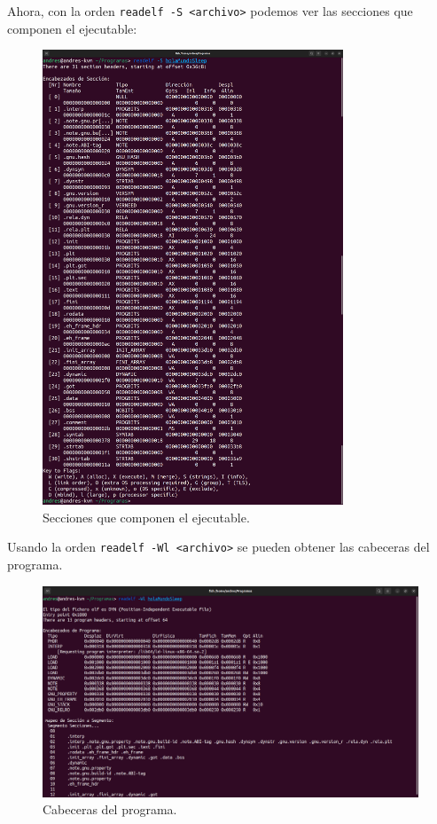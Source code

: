 \documentclass{article}
\begin{document}
\newpage

Ahora, con la orden \verb|readelf -S <archivo>| podemos ver las secciones que componen el ejecutable:

\begin{figure}[H]
    \centering
    \includegraphics[width=0.8\textwidth]{imagenes/readelfSsleep.png}
    \caption{Secciones que componen el ejecutable.}
\end{figure}

\newpage

Usando la orden \verb|readelf -Wl <archivo>| se pueden obtener las cabeceras del programa.

\begin{figure}[H]
    \includegraphics[width=\textwidth]{imagenes/Captura desde 2022-11-17 18-38-45.png}
    \caption{Cabeceras del programa.}
\end{figure}
\end{document}
